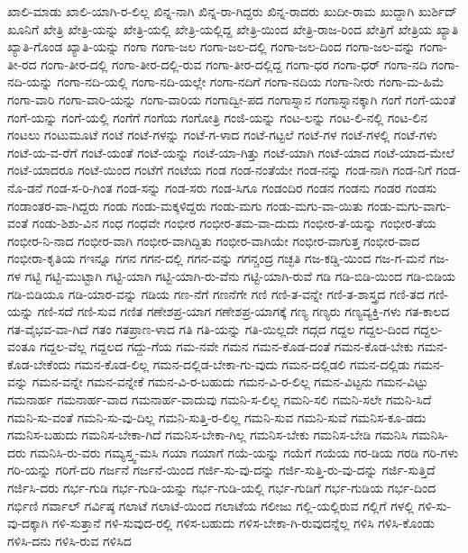 {ಖಾಲಿ-ಮಾಡು
ಖಾಲಿ-ಯಾಗಿ-ರ-ಲಿಲ್ಲ
ಖಿನ್ನ-ನಾಗಿ
ಖಿನ್ನ-ರಾ-ಗಿದ್ದರು
ಖಿನ್ನ-ರಾದರು
ಖುದೀ-ರಾಮ
ಖುದ್ದಾಗಿ
ಖುರ್ಶಿದ್
ಖೂನಿಗೆ
ಖೇತ್ರಿ
ಖೇತ್ರಿ-ಯನ್ನು
ಖೇತ್ರಿ-ಯಲ್ಲಿ
ಖೇತ್ರಿ-ಯಲ್ಲಿದ್ದ
ಖೇತ್ರಿ-ಯಿಂದ
ಖೇತ್ರಿ-ರಾಜ-ರಿಂದ
ಖೇತ್ರಿಗೆ
ಖೇತ್ರಿಯ
ಖ್ಯಾತಿ
ಖ್ಯಾತಿ-ಗೊಂಡ
ಖ್ಯಾತಿ-ಯನ್ನು
ಗಂಗಾ
ಗಂಗಾ-ಜಲ
ಗಂಗಾ-ಜಲ-ದಲ್ಲಿ
ಗಂಗಾ-ಜಲ-ದಿಂದ
ಗಂಗಾ-ಜಲ-ವನ್ನು
ಗಂಗಾ-ತೀ-ರದ
ಗಂಗಾ-ತೀರ-ದಲ್ಲಿ
ಗಂಗಾ-ತೀರ-ದಲ್ಲಿ-ರುವ
ಗಂಗಾ-ತೀರ-ದಲ್ಲಿದ್ದ
ಗಂಗಾ-ಧರ
ಗಂಗಾ-ಧರ್
ಗಂಗಾ-ನದಿ
ಗಂಗಾ-ನದಿ-ಯನ್ನು
ಗಂಗಾ-ನದಿ-ಯಲ್ಲಿ
ಗಂಗಾ-ನದಿ-ಯಲ್ಲೇ
ಗಂಗಾ-ನದಿಗೆ
ಗಂಗಾ-ನದಿಯ
ಗಂಗಾ-ನೀರು
ಗಂಗಾ-ಮ-ಹಿಮೆ
ಗಂಗಾ-ವಾರಿ
ಗಂಗಾ-ವಾರಿ-ಯನ್ನು
ಗಂಗಾ-ವಾರಿಯ
ಗಂಗಾದ್ವೀ-ಪದ
ಗಂಗಾಸ್ನಾನ
ಗಂಗಾಸ್ನಾನಕ್ಕಾಗಿ
ಗಂಗೆ
ಗಂಗೆ-ಯಂತೆ
ಗಂಗೆ-ಯನ್ನು
ಗಂಗೆ-ಯಲ್ಲಿ
ಗಂಗೆಗೆ
ಗಂಗೆಯ
ಗಂಗೋತ್ರಿ
ಗಂಜಿ-ಯನ್ನು
ಗಂಟ-ಲನ್ನು
ಗಂಟ-ಲಿ-ನಲ್ಲಿ
ಗಂಟ-ಲಿನ
ಗಂಟಲು
ಗಂಟುಮೂಟೆ
ಗಂಟೆ
ಗಂಟೆ-ಗಳನ್ನು
ಗಂಟೆ-ಗ-ಳಾದ
ಗಂಟೆ-ಗಟ್ಟಲೆ
ಗಂಟೆ-ಗಳ
ಗಂಟೆ-ಗಳಲ್ಲಿ
ಗಂಟೆ-ಗಳು
ಗಂಟೆ-ಯ-ವ-ರೆಗೆ
ಗಂಟೆ-ಯಂತೆ
ಗಂಟೆ-ಯನ್ನು
ಗಂಟೆ-ಯಾ-ಗಿತ್ತು
ಗಂಟೆ-ಯಾಗಿ
ಗಂಟೆ-ಯಾದ
ಗಂಟೆ-ಯಾದ-ಮೇಲೆ
ಗಂಟೆ-ಯಾದರೂ
ಗಂಟೆ-ಯಿಂದ
ಗಂಟೆಗೆ
ಗಂಟೆಯ
ಗಂಡ
ಗಂಡ-ನಂತೆಯೇ
ಗಂಡ-ನನ್ನು
ಗಂಡ-ನಾಗಿ
ಗಂಡ-ನಿಗೆ
ಗಂಡ-ನೊ-ಡನೆ
ಗಂಡ-ಸ-ರಿ-ಗಿಂತ
ಗಂಡ-ಸನ್ನು
ಗಂಡ-ಸರು
ಗಂಡ-ಸಿಗೂ
ಗಂಡಂದಿರ
ಗಂಡನ
ಗಂಡನು
ಗಂಡರ
ಗಂಡಸು
ಗಂಡಾಂತರ-ವಾ-ಗಿದ್ದರು
ಗಂಡು
ಗಂಡು-ಮಕ್ಕಳಿದ್ದರು
ಗಂಡು-ಮಗು
ಗಂಡು-ಮಗು-ವಾ-ಯಿತು
ಗಂಡು-ಮಗು-ವಾಗು-ವಂತೆ
ಗಂಡು-ಶಿಶು-ವಿನ
ಗಂಧ
ಗಂಧವೇ
ಗಂಭೀರ
ಗಂಭೀರ-ತಮ-ವಾ-ದುದು
ಗಂಭೀರ-ತೆ-ಯನ್ನು
ಗಂಭೀರ-ತೆಯ
ಗಂಭೀರ-ನಿ-ನಾದ
ಗಂಭೀರ-ವಾಗಿ
ಗಂಭೀರ-ವಾಗಿದ್ದಿತು
ಗಂಭೀರ-ವಾಗಿಯೇ
ಗಂಭೀರ-ವಾಗುತ್ತ
ಗಂಭೀರ-ವಾದ
ಗಂಭೀರಾ-ಕೃತಿಯ
ಗಇನ್ನೂ
ಗಗನ
ಗಗನ-ದಲ್ಲಿ
ಗಗನ-ವನ್ನು
ಗಗನ್ಚಂದ್ರ
ಗಚ್ಛತಿ
ಗಜ-ಕಡ್ಡಿ-ಯಿಂದ
ಗಜ-ಗ-ಮನೆ
ಗಜ-ಗಳ
ಗಟ್ಟಿ
ಗಟ್ಟಿ-ಮುಟ್ಟಾಗಿ
ಗಟ್ಟಿ-ಯಾಗಿ
ಗಟ್ಟಿ-ಯಾಗಿ-ರು-ವೆನು
ಗಟ್ಟಿ-ಯಾಗಿ-ರುವೆ
ಗಡಿ
ಗಡಿ-ಬಿಡಿ-ಯಿಂದ
ಗಡಿ-ಬಿಡಿಯ
ಗಡಿ-ಬಿಡಿಯೂ
ಗಡಿ-ಯಾರ-ವನ್ನು
ಗಡಿಯ
ಗಣ-ನೆಗೆ
ಗಣನೆಗೇ
ಗಣಿ
ಗಣಿ-ತ-ವನ್ನೇ
ಗಣಿ-ತ-ಶಾಸ್ತ್ರದ
ಗಣಿ-ತದ
ಗಣಿ-ಯನ್ನು
ಗಣಿ-ಸದೆ
ಗಣಿ-ಸುವ
ಗಣಿತ
ಗಣೇಶಪ್ರ-ಯಾಗ
ಗಣೇಶಪ್ರ-ಯಾಗಕ್ಕೆ
ಗಣ್ಯ
ಗಣ್ಯರು
ಗಣ್ಯವ್ಯಕ್ತಿ-ಗಳು
ಗತ-ಕಾಲದ
ಗತ-ವೈಭವ-ವಾ-ಗಿದೆ
ಗತಂ
ಗತಪ್ರಾಣ-ಳಾದ
ಗತಿ
ಗತಿ-ಯನ್ನು
ಗತಿ-ಯಿಲ್ಲದೇ
ಗದ್ಗದ
ಗದ್ದಲ
ಗದ್ದಲ-ದಿಂದ
ಗದ್ದಲ-ವಂತೂ
ಗದ್ದಲ-ವೆಲ್ಲ
ಗದ್ದಲದ
ಗದ್ದು-ಗೆಯ
ಗಮ-ನವೇ
ಗಮನ
ಗಮನ-ಕೊಡ-ದಂತೆ
ಗಮನ-ಕೊಡ-ಬೇಕು
ಗಮನ-ಕೊಡ-ಬೇಕೆಂದು
ಗಮನ-ಕೊಡ-ಲಿಲ್ಲ
ಗಮನ-ದಲ್ಲಿಡ-ಬೇಕಾ-ಗು-ವುದು
ಗಮನ-ದಲ್ಲಿಡಲಿ
ಗಮನ-ದಲ್ಲಿಡು
ಗಮನ-ವನ್ನು
ಗಮನ-ವನ್ನೇ
ಗಮನ-ವನ್ನೇಕೆ
ಗಮನ-ವಿ-ರ-ಬಹುದು
ಗಮನ-ವಿ-ರ-ಲಿಲ್ಲ
ಗಮನ-ವಿಟ್ಟನು
ಗಮನ-ವಿಟ್ಟು
ಗಮನಾರ್ಹ
ಗಮನಾರ್ಹ-ವಾದ
ಗಮನಾರ್ಹ-ವಾದುವು
ಗಮನಿ-ಸ-ಲಿಲ್ಲ
ಗಮನಿ-ಸಲಿ
ಗಮನಿ-ಸಲೇ
ಗಮನಿ-ಸಿದೆ
ಗಮನಿ-ಸು-ವಂತೆ
ಗಮನಿ-ಸು-ವು-ದಿಲ್ಲ
ಗಮನಿ-ಸುತ್ತಿ-ರ-ಲಿಲ್ಲ
ಗಮನಿ-ಸುವ
ಗಮನಿ-ಸುವೆ
ಗಮನಿಸ-ಕೂ-ಡದು
ಗಮನಿಸ-ಬಹುದು
ಗಮನಿಸ-ಬೇಕಾ-ಗಿದೆ
ಗಮನಿಸ-ಬೇಕಾ-ಗಿಲ್ಲ
ಗಮನಿಸ-ಬೇಕು
ಗಮನಿಸ-ಬೇಡಿ
ಗಮನಿಸಿ
ಗಮನಿಸಿ-ದರು
ಗಮನಿಸಿ-ರು-ವರು
ಗಮ್ಯಸ್ತ್ವ-ಮಸಿ
ಗಯಾ
ಗಯಾಗೆ
ಗಯೆ-ಯನ್ನು
ಗಯೆಗೆ
ಗಯೆಯ
ಗರ-ಡಿಯ
ಗರಡಿ
ಗರಿ-ಗಳು
ಗರಿ-ಯನ್ನು
ಗರಿಗೆ-ದರಿ
ಗರ್ಜನೆ
ಗರ್ಜನೆ-ಯಿಂದ
ಗರ್ಜಿ-ಸು-ವು-ದನ್ನು
ಗರ್ಜಿ-ಸುತ್ತಿ-ರು-ವು-ದನ್ನು
ಗರ್ಜಿ-ಸುತ್ತಿದೆ
ಗರ್ಜಿಸಿ-ದರು
ಗರ್ಭ-ಗುಡಿ
ಗರ್ಭ-ಗುಡಿ-ಯನ್ನು
ಗರ್ಭ-ಗುಡಿ-ಯಲ್ಲಿ
ಗರ್ಭ-ಗುಡಿಗೆ
ಗರ್ಭ-ಗುಡಿಯ
ಗರ್ಭ-ದಿಂದ
ಗರ್ಭಿಣಿ
ಗರ್ವಾಲ್
ಗರ್ವಿಷ್ಠ
ಗಲಾಟೆ
ಗಲಾಟೆ-ಯಿಂದ
ಗಲಾಟೆಯ
ಗಲೀಜು
ಗಲ್ಲಿ-ಯಲ್ಲಿರುವ
ಗಲ್ಲಿಗೆ
ಗಳಲ್ಲಿ
ಗಳಿ-ಸು-ವು-ದಕ್ಕಾಗಿ
ಗಳಿ-ಸುತ್ತಾನೆ
ಗಳಿ-ಸುವುದ-ರಲ್ಲಿ
ಗಳಿಸ-ಬಹುದು
ಗಳಿಸ-ಬೇಕಾ-ಗಿ-ರುವುದನ್ನೆಲ್ಲ
ಗಳಿಸಿ
ಗಳಿಸಿ-ಕೊಂಡು
ಗಳಿಸಿ-ದನು
ಗಳಿಸಿ-ರುವ
ಗಳಿಸಿದ
}
